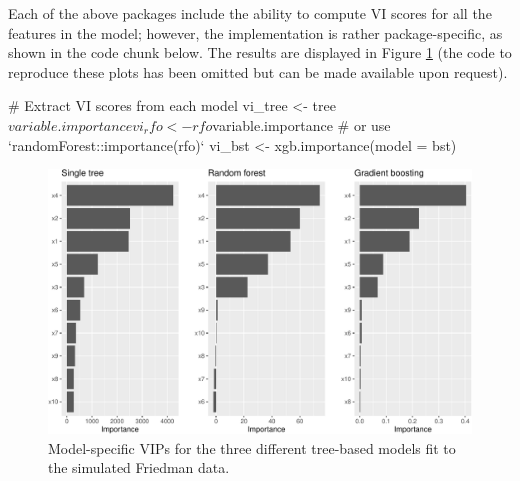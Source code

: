\begin{Schunk}
\end{Schunk}

Each of the above packages include the ability to compute VI scores for
all the features in the model; however, the implementation is rather
package-specific, as shown in the code chunk below. The results are
displayed in Figure \ref{fig:vi-plots} (the code to reproduce these
plots has been omitted but can be made available upon request).

\begin{Schunk}
\begin{Sinput}
# Extract VI scores from each model
vi_tree <- tree$variable.importance
vi_rfo <- rfo$variable.importance  # or use `randomForest::importance(rfo)`
vi_bst <- xgb.importance(model = bst)
\end{Sinput}
\end{Schunk}

\begin{Schunk}
\begin{figure}[!htb]

{\centering \includegraphics[width=1\linewidth]{greenwell-boehmke_files/figure-latex/vi-plots-1}

}

\caption[Model-specific VIPs for the three different tree-based models fit to the simulated Friedman data]{Model-specific VIPs for the three different tree-based models fit to the simulated Friedman data.}\label{fig:vi-plots}
\end{figure}
\end{Schunk}

